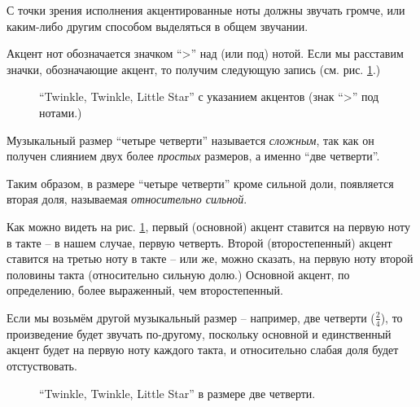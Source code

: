 \documentclass[../sparc.tex]{subfiles}
\begin{document}
С точки зрения исполнения акцентированные ноты должны звучать громче, или
каким-либо другим способом выделяться в общем звучании.

Акцент нот обозначается значком ``>'' над (или под) нотой.  Если мы расставим
значки, обозначающие акцент, то получим следующую запись
(см. рис. \ref{fig:lilypond-musical-scale-example-2}.)

\begin{figure}[ht]
  \centering
  \caption{``Twinkle, Twinkle, Little Star'' с указанием акцентов (знак ``>''
    под нотами.)}
  \label{fig:lilypond-musical-scale-example-2}
\end{figure}

Музыкальный размер ``четыре четверти'' называется \emph{сложным}, так как он
получен слиянием двух более \emph{простых} размеров, а именно ``две четверти''.

Таким образом, в размере ``четыре четверти'' кроме сильной доли, появляется
вторая доля, называемая \emph{относительно сильной}.

Как можно видеть на рис. \ref{fig:lilypond-musical-scale-example-2}, первый
(основной) акцент ставится на первую ноту в такте -- в нашем случае, первую
четверть.  Второй (второстепенный) акцент ставится на третью ноту в такте -- или
же, можно сказать, на первую ноту второй половины такта (относительно сильную
долю.)  Основной акцент, по определению, более выраженный, чем второстепенный.

Если мы возьмём другой музыкальный размер -- например, две четверти
($\frac{2}{4}$), то произведение будет звучать по-другому, поскольку основной и
единственный акцент будет на первую ноту каждого такта, и относительно слабая
доля будет отстуствовать.

\begin{figure}[ht]
  \centering
  \caption{``Twinkle, Twinkle, Little Star'' в размере две четверти.}
  \label{fig:lilypond-musical-scale-example-3}
\end{figure}
\end{document}
